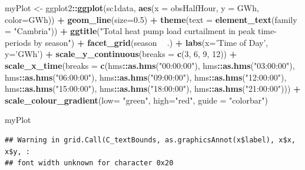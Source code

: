 \documentclass[]{article}
\newenvironment{Shaded}{\begin{snugshade}}{\end{snugshade}}
\newcommand{\KeywordTok}[1]{\textcolor[rgb]{0.13,0.29,0.53}{\textbf{#1}}}
\newcommand{\DataTypeTok}[1]{\textcolor[rgb]{0.13,0.29,0.53}{#1}}
\newcommand{\DecValTok}[1]{\textcolor[rgb]{0.00,0.00,0.81}{#1}}
\newcommand{\FloatTok}[1]{\textcolor[rgb]{0.00,0.00,0.81}{#1}}
\newcommand{\StringTok}[1]{\textcolor[rgb]{0.31,0.60,0.02}{#1}}
\newcommand{\OperatorTok}[1]{\textcolor[rgb]{0.81,0.36,0.00}{\textbf{#1}}}
\newcommand{\NormalTok}[1]{#1}
\theoremstyle{definition}
\theoremstyle{definition}
\theoremstyle{definition}
\theoremstyle{remark}
\begin{document}
\begin{Shaded}
\begin{Highlighting}[]
\NormalTok{myPlot <-}\StringTok{ }\NormalTok{ggplot2}\OperatorTok{::}\KeywordTok{ggplot}\NormalTok{(sc1data, }\KeywordTok{aes}\NormalTok{(}\DataTypeTok{x =}\NormalTok{ obsHalfHour, }\DataTypeTok{y =}\NormalTok{ GWh, }\DataTypeTok{color=}\NormalTok{GWh)) }\OperatorTok{+}
\StringTok{  }\KeywordTok{geom_line}\NormalTok{(}\DataTypeTok{size=}\FloatTok{0.5}\NormalTok{) }\OperatorTok{+}
\StringTok{  }\KeywordTok{theme}\NormalTok{(}\DataTypeTok{text =} \KeywordTok{element_text}\NormalTok{(}\DataTypeTok{family =} \StringTok{"Cambria"}\NormalTok{)) }\OperatorTok{+}
\StringTok{  }\KeywordTok{ggtitle}\NormalTok{(}\StringTok{"Total heat pump load curtailment in peak time-periods by season"}\NormalTok{) }\OperatorTok{+}
\StringTok{  }\KeywordTok{facet_grid}\NormalTok{(season }\OperatorTok{~}\StringTok{ }\NormalTok{.) }\OperatorTok{+}
\StringTok{  }\KeywordTok{labs}\NormalTok{(}\DataTypeTok{x=}\StringTok{'Time of Day'}\NormalTok{, }\DataTypeTok{y=}\StringTok{'GWh'}\NormalTok{) }\OperatorTok{+}
\StringTok{  }\KeywordTok{scale_y_continuous}\NormalTok{(}\DataTypeTok{breaks =} \KeywordTok{c}\NormalTok{(}\DecValTok{3}\NormalTok{, }\DecValTok{6}\NormalTok{, }\DecValTok{9}\NormalTok{, }\DecValTok{12}\NormalTok{)) }\OperatorTok{+}
\StringTok{  }\KeywordTok{scale_x_time}\NormalTok{(}\DataTypeTok{breaks =} \KeywordTok{c}\NormalTok{(hms}\OperatorTok{::}\KeywordTok{as.hms}\NormalTok{(}\StringTok{"00:00:00"}\NormalTok{), hms}\OperatorTok{::}\KeywordTok{as.hms}\NormalTok{(}\StringTok{"03:00:00"}\NormalTok{), hms}\OperatorTok{::}\KeywordTok{as.hms}\NormalTok{(}\StringTok{"06:00:00"}\NormalTok{),       hms}\OperatorTok{::}\KeywordTok{as.hms}\NormalTok{(}\StringTok{"09:00:00"}\NormalTok{), hms}\OperatorTok{::}\KeywordTok{as.hms}\NormalTok{(}\StringTok{"12:00:00"}\NormalTok{), }
\NormalTok{  hms}\OperatorTok{::}\KeywordTok{as.hms}\NormalTok{(}\StringTok{"15:00:00"}\NormalTok{), hms}\OperatorTok{::}\KeywordTok{as.hms}\NormalTok{(}\StringTok{"18:00:00"}\NormalTok{), hms}\OperatorTok{::}\KeywordTok{as.hms}\NormalTok{(}\StringTok{"21:00:00"}\NormalTok{))) }\OperatorTok{+}
\StringTok{  }\KeywordTok{scale_colour_gradient}\NormalTok{(}\DataTypeTok{low=} \StringTok{"green"}\NormalTok{, }\DataTypeTok{high=}\StringTok{"red"}\NormalTok{, }\DataTypeTok{guide =} \StringTok{"colorbar"}\NormalTok{)}

\NormalTok{myPlot}
\end{Highlighting}
\end{Shaded}

\begin{verbatim}
## Warning in grid.Call(C_textBounds, as.graphicsAnnot(x$label), x$x, x$y, :
## font width unknown for character 0x20
\end{verbatim}
\end{document}
